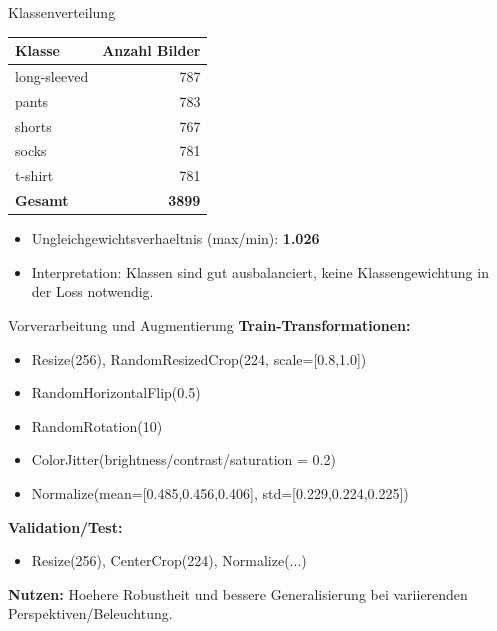 \documentclass{beamer}
\begin{document}
\begin{frame}{Klassenverteilung}
\begin{table}[h]
\centering
\begin{tabular}{l r}
\toprule
\textbf{Klasse} & \textbf{Anzahl Bilder} \\
\midrule
long-sleeved & 787 \\
pants & 783 \\
shorts & 767 \\
socks & 781 \\
t-shirt & 781 \\
\midrule
\textbf{Gesamt} & \textbf{3899} \\
\bottomrule
\end{tabular}
\end{table}

\begin{itemize}
    \item Ungleichgewichtsverhaeltnis (max/min): \textbf{1.026}
    \item Interpretation: Klassen sind gut ausbalanciert, keine Klassengewichtung in der Loss notwendig.
\end{itemize}

\end{frame}

\begin{frame}{Vorverarbeitung und Augmentierung}
\textbf{Train-Transformationen:}
\begin{itemize}
    \item Resize(256), RandomResizedCrop(224, scale=[0.8,1.0])
    \item RandomHorizontalFlip(0.5)
    \item RandomRotation(10)
    \item ColorJitter(brightness/contrast/saturation = 0.2)
    \item Normalize(mean=[0.485,0.456,0.406], std=[0.229,0.224,0.225])
\end{itemize}

\textbf{Validation/Test:}
\begin{itemize}
    \item Resize(256), CenterCrop(224), Normalize(...)
\end{itemize}

\textbf{Nutzen:} Hoehere Robustheit und bessere Generalisierung bei variierenden Perspektiven/Beleuchtung.

\end{frame}
\end{document}
